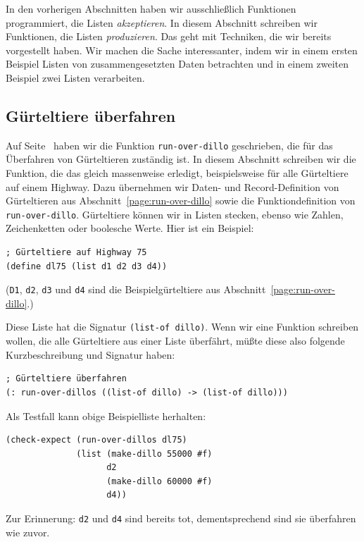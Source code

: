 In den vorherigen Abschnitten haben wir ausschließlich Funktionen
programmiert, die Listen \emph{akzeptieren}.  In diesem Abschnitt
schreiben wir Funktionen, die Listen \emph{produzieren}.  Das geht mit
Techniken, die wir bereits vorgestellt haben.  Wir machen die Sache
interessanter, indem wir in einem ersten Beispiel Listen von
zusammengesetzten Daten betrachten und in einem zweiten Beispiel zwei
Listen verarbeiten.

\subsection{Gürteltiere überfahren}

Auf Seite~\pageref{page:run-over-dillo} haben wir die Funktion
\texttt{run-over-dillo} geschrieben, die für das Überfahren von
Gürteltieren zuständig ist.  In diesem Abschnitt schreiben wir die
Funktion, die das gleich massenweise erledigt, beispielsweise für alle
Gürteltiere auf einem Highway.  Dazu übernehmen wir Daten- und
Record-Definition von Gürteltieren aus
Abschnitt~\ref{page:run-over-dillo} sowie die Funktiondefinition von
\texttt{run-over-dillo}.  Gürteltiere können wir in Listen stecken,
ebenso wie Zahlen, Zeichenketten oder boolesche Werte.  Hier ist ein
Beispiel:
%
\begin{verbatim}
; Gürteltiere auf Highway 75
(define dl75 (list d1 d2 d3 d4))
\end{verbatim}
(\texttt{D1}, \texttt{d2}, \texttt{d3} und \texttt{d4} sind die
Beispielgürteltiere aus Abschnitt~\ref{page:run-over-dillo}.)

Diese Liste hat die Signatur \texttt{(list-of dillo)}.  Wenn wir eine
Funktion schreiben wollen, die alle Gürteltiere aus einer Liste
überfährt, müßte diese also folgende Kurzbeschreibung und Signatur
haben:
%
\begin{verbatim}
; Gürteltiere überfahren
(: run-over-dillos ((list-of dillo) -> (list-of dillo)))
\end{verbatim}
%
Als Testfall kann obige Beispielliste herhalten:
%
\begin{verbatim}
(check-expect (run-over-dillos dl75)
              (list (make-dillo 55000 #f)
                    d2
                    (make-dillo 60000 #f)
                    d4))
\end{verbatim}
%
Zur Erinnerung: \texttt{d2} und \texttt{d4} sind bereits tot,
dementsprechend sind sie überfahren wie zuvor.

